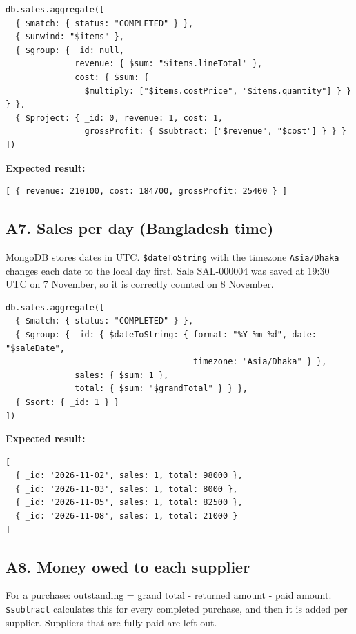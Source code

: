 \documentclass[11pt,a4paper]{article}
\newcommand{\code}[1]{\texttt{#1}}
\begin{document}
\begin{minipage}{\linewidth}
\begin{lstlisting}[style=query]
db.sales.aggregate([
  { $match: { status: "COMPLETED" } },
  { $unwind: "$items" },
  { $group: { _id: null,
              revenue: { $sum: "$items.lineTotal" },
              cost: { $sum: {
                $multiply: ["$items.costPrice", "$items.quantity"] } } } },
  { $project: { _id: 0, revenue: 1, cost: 1,
                grossProfit: { $subtract: ["$revenue", "$cost"] } } }
])
\end{lstlisting}
\end{minipage}

\noindent\textbf{Expected result:}
\begin{lstlisting}[style=result]
[ { revenue: 210100, cost: 184700, grossProfit: 25400 } ]
\end{lstlisting}

\subsection*{A7. Sales per day (Bangladesh time)}
MongoDB stores dates in UTC. \code{\$dateToString} with the timezone \code{Asia/Dhaka} changes each date to the local day first. Sale SAL-000004 was saved at 19:30 UTC on 7 November, so it is correctly counted on 8 November.

\begin{minipage}{\linewidth}
\begin{lstlisting}[style=query]
db.sales.aggregate([
  { $match: { status: "COMPLETED" } },
  { $group: { _id: { $dateToString: { format: "%Y-%m-%d", date: "$saleDate",
                                      timezone: "Asia/Dhaka" } },
              sales: { $sum: 1 },
              total: { $sum: "$grandTotal" } } },
  { $sort: { _id: 1 } }
])
\end{lstlisting}
\end{minipage}

\noindent\textbf{Expected result:}
\begin{lstlisting}[style=result]
[
  { _id: '2026-11-02', sales: 1, total: 98000 },
  { _id: '2026-11-03', sales: 1, total: 8000 },
  { _id: '2026-11-05', sales: 1, total: 82500 },
  { _id: '2026-11-08', sales: 1, total: 21000 }
]
\end{lstlisting}

\subsection*{A8. Money owed to each supplier}
For a purchase: outstanding = grand total - returned amount - paid amount. \code{\$subtract} calculates this for every completed purchase, and then it is added per supplier. Suppliers that are fully paid are left out.
\end{document}
